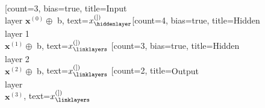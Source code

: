 \documentclass{standalone}
\begin{document}
    \begin{neuralnetwork}[height=5, layerspacing=15mm]
        \newcommand{\x}[2]{$x^{(#1)}_#2$}
        [count=3, bias=true, title=\scriptsize{Input\\layer $\mathbf{x}^{(0)}\oplus$ b}, text=\x]
        \hiddenlayer[count=4, bias=true, title=\scriptsize{Hidden\\layer 1\\$\mathbf{x}^{(1)}\oplus$ b}, text=\x] \linklayers
        \hiddenlayer[count=3, bias=true, title=\scriptsize{Hidden\\layer 2\\$\mathbf{x}^{(2)}\oplus$ b}, text=\x] \linklayers
        \outputlayer[count=2, title=\scriptsize{Output\\layer\\$\mathbf{x}^{(3)}$}, text=\x] \linklayers
    \end{neuralnetwork}
\end{document}

